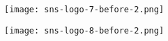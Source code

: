 \begin{figure}[h]
\centering
%
\begin{minipage}{0.49\textwidth}
\centering
\texttt{[image: sns-logo-7-before-2.png]}
\end{minipage}
%
\hspace{0.0\textwidth}
%
\begin{minipage}{0.49\textwidth}
\centering
\texttt{[image: sns-logo-8-before-2.png]}
\end{minipage}
%
\end{figure}

